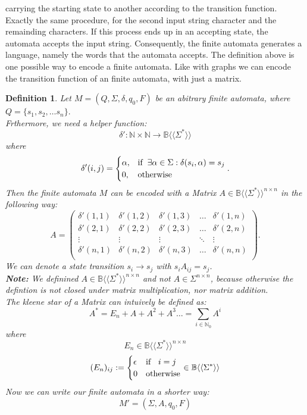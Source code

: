 \documentclass[12pt,letterpaper]{article}
\newtheorem{definition}{Definition}
\newcommand{\fps}[1] {
\mathbb{#1}\langle \langle \Sigma^* \rangle \rangle
}
\begin{document}
carrying the starting state to another according to the transition function.
Exactly the same procedure, for the second input string character and the 
remainding characters. If this process ends up in an accepting state, 
the automata accepts the input string. Consequently, 
the finite automata generates a language, namely the words that the automata 
accepts. The definition above is one possible way to encode a finite automata. 
Like with graphs we can encode the transition function of an finite
automata, with just a matrix.
\begin{definition}
  Let $M = (Q, \Sigma, \delta, q_0, F)$ be an abitrary finite 
  automata, where $Q = \{ s_1, s_2, \dots s_n\}.$ \\
  Frthermore, we need a helper function:
  \[
    \delta': \mathbb{N} \times \mathbb{N} \to \fps{B}
  \]
  where
  \[
    \delta'(i, j) = 
      \begin{cases}
        \alpha, & \text{if} \hspace{0.2cm} \exists \alpha \in \Sigma: 
          \delta(s_i, \alpha) = s_j \\
        0, & \text{otherwise}
      \end{cases}.
  \]
  Then the finite automata $M$ can be encoded with a Matrix
  $A \in \fps{B}^{n \times n}$
  in the following way:
  \[
    A = 
    \begin{pmatrix}
      \delta'(1,1)       & \delta'(1,2) & \delta'(1,3) & \dots & \delta'(1,n) \\
      \delta'(2,1)       & \delta'(2,2) & \delta'(2,3) & \dots & \delta'(2,n) \\
      \vdots             & \vdots       & \vdots       & \ddots& \vdots\\
      \delta'(n,1)       & \delta'(n,2) & \delta'(n,3) & \dots & \delta'(n,n) \\
    \end{pmatrix}
  .\]
  We can denote a state transition $s_i \to s_j$ with $s_iA_{ij} = s_j$.\\
  {\bf Note:} We definined $A \in \fps{B}^{n \times n}$ and not 
  $A \in \Sigma^{n \times n}$, because otherwise the defintion is not closed
  under matrix multiplication, nor matrix addition.\\
  The kleene star of a Matrix can intuively  be defined as:
  \[
    A^* = E_n + A + A^2 + A^3 \dots  = \sum_{i \in \mathbb{N}_0} A^i
  \]
  where
  \[ E_n \in \fps{B}^{n \times n}\]
  \[
    (E_n)_{ij} := 
    \begin{cases}
      \epsilon & \text{if } \hspace{0.2cm} i=j \\
      0        & \text{otherwise}
    \end{cases} \in \fps{B}
  \]
  Now we can write our finite automata in a shorter way:
  \[
    M' = (\Sigma, A, q_0, F)
  \]
\end{definition}
\end{document}
